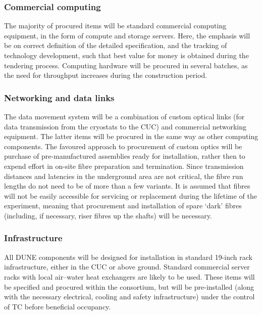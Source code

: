 \subsubsection{Commercial computing}

The majority of procured items will be standard commercial computing equipment, in the form of compute and storage servers. Here, the emphasis will be on correct definition of the detailed specification, and the tracking of technology development, such that best value for money is obtained during the tendering process. Computing hardware will be procured in several batches, as the need for  throughput increases during the construction period. 

\subsubsection{Networking and data links}

The data movement system will be a combination of custom optical links (for data transmission from the cryostats to the CUC) and commercial networking equipment. The latter items will be procured in the same way as other computing components. The favoured approach to procurement of custom optics will be purchase of pre-manufactured assemblies ready for installation, rather then to expend effort in on-site fibre preparation and termination. Since transmission distances and latencies in the underground area are not critical, the fibre run lengths do not need to be of more than a few variants. It is assumed that fibres will not be easily accessible for servicing or replacement during the lifetime of the experiment, meaning that procurement and installation of spare `dark' fibres (including, if necessary, riser fibres up the shafts) will be necessary.

\subsubsection{Infrastructure}

All DUNE  components will be designed for installation in standard 19-inch rack infrastructure, either in the CUC or above ground. Standard commercial server racks with local air--water heat exchangers are likely to be used. These items will be specified and procured within the consortium, but will be pre-installed (along with the necessary electrical, cooling and safety infrastructure) under the control of TC before  beneficial occupancy.


